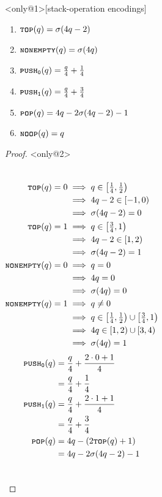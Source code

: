 \documentclass{beamer}
\newcommand{\pushone}{\texttt{\textsc{push}}\textsubscript{\texttt{1}}}
\newcommand{\pushzero}{\texttt{\textsc{push}}\textsubscript{\texttt{0}}}
\newcommand{\nonempty}{\textsc{\texttt{nonempty}}}
\newcommand{\tos}{\textsc{\texttt{top}}}
\newcommand{\pop}{\textsc{\texttt{pop}}}
\newcommand{\noop}{\textsc{\texttt{noop}}}
\begin{document}
\begin{frame}
	\begin{teorema}<only@1>[stack-operation encodings]
		\begin{enumerate}
			\item$\tos(q)=\sigma(4q-2)$
			\item$\nonempty(q)=\sigma(4q)$
			\item$\pushzero(q)=\frac{q}{4}+\frac{1}{4}$
			\item$\pushone(q)=\frac{q}{4}+\frac{3}{4}$
			\item$\pop(q)=4q-2\sigma(4q-2)-1$
			\item$\noop(q)=q$
		\end{enumerate}
	\end{teorema}
	\begin{proof}<only@2>
		\footnotesize
		\begin{columns}
			\begin{align*}
			\tos(q)=0     &\implies q\in\left[\textstyle{\frac{1}{4},\frac{1}{2}}\right)\\
			              &\implies 4q-2\in[-1,0)\\
			              &\implies\sigma(4q-2)=0\\
			\tos(q)=1     &\implies q\in\left[\textstyle{\frac{3}{4}},1\right)\\
			              &\implies 4q-2\in[1,2)\\
			              &\implies\sigma(4q-2)=1\\
			\nonempty(q)=0&\implies q=0\\
			              &\implies 4q=0\\
			              &\implies\sigma(4q)=0\\
			\nonempty(q)=1&\implies q\neq 0\\
			              &\implies q\in\textstyle{\left[\frac{1}{4},\frac{1}{2}\right)\cup\left[\frac{3}{4},1\right)}\\
			              &\implies 4q\in[1,2)\cup[3,4)\\
			              &\implies\sigma(4q)=1
			\end{align*}
			\begin{align*}
			\pushzero(q)&=\frac{q}{4}+\frac{2\cdot 0+1}{4}\\
			            &=\frac{q}{4}+\frac{1}{4}\\
			\pushone(q) &=\frac{q}{4}+\frac{2\cdot 1+1}{4}\\
			            &=\frac{q}{4}+\frac{3}{4}\\
			\pop(q)     &=4q-(2\tos(q)+1)\\
			            &=4q-2\sigma(4q-2)-1
			\end{align*}
		\end{columns}
	\end{proof}
\end{frame}
\end{document}
